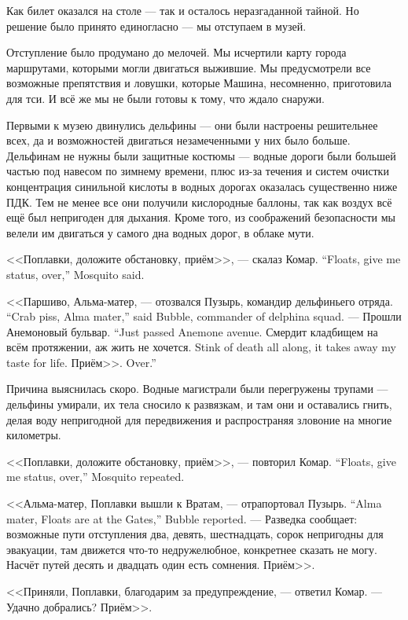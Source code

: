 Как билет оказался на столе --- так и осталось неразгаданной тайной.
Но решение было принято единогласно --- мы отступаем в музей.

Отступление было продумано до мелочей.
Мы исчертили карту города маршрутами, которыми могли двигаться выжившие.
Мы предусмотрели все возможные препятствия и ловушки, которые Машина, несомненно, приготовила для тси.
И всё же мы не были готовы к тому, что ждало снаружи.

Первыми к музею двинулись дельфины --- они были настроены решительнее всех, да и возможностей двигаться незамеченными у них было больше.
Дельфинам не нужны были защитные костюмы --- водные дороги были большей частью под навесом по зимнему времени, плюс из-за течения и систем очистки концентрация синильной кислоты в водных дорогах оказалась существенно ниже ПДК.
Тем не менее все они получили кислородные баллоны, так как воздух всё ещё был непригоден для дыхания.
Кроме того, из соображений безопасности мы велели им двигаться у самого дна водных дорог, в облаке мути.

{<<Поплавки, доложите обстановку, приём>>, --- скалаз Комар.}
{``Floats, give me status, over,'' Mosquito said.}

{<<Паршиво, Альма-матер, --- отозвался Пузырь, командир дельфиньего отряда.}
{``Crab piss, Alma mater,'' said Bubble, commander of delphina squad.}
{--- Прошли Анемоновый бульвар.}
{``Just passed Anemone avenue.}
{Смердит кладбищем на всём протяжении, аж жить не хочется.}
{Stink of death all along, it takes away my taste for life.}
{Приём>>.}
{Over.''}

Причина выяснилась скоро.
Водные магистрали были перегружены трупами --- дельфины умирали, их тела сносило к развязкам, и там они и оставались гнить, делая воду непригодной для передвижения и распространяя зловоние на многие километры.

{<<Поплавки, доложите обстановку, приём>>, --- повторил Комар.}
{``Floats, give me status, over,'' Mosquito repeated.}

{<<Альма-матер, Поплавки вышли к Вратам, --- отрапортовал Пузырь.}
{``Alma mater, Floats are at the Gates,'' Bubble reported.}
--- Разведка сообщает: возможные пути отступления два, девять, шестнадцать, сорок непригодны для эвакуации, там движется что-то недружелюбное, конкретнее сказать не могу.
Насчёт путей десять и двадцать один есть сомнения.
Приём>>.

<<Приняли, Поплавки, благодарим за предупреждение, --- ответил Комар.
--- Удачно добрались?
Приём>>.

